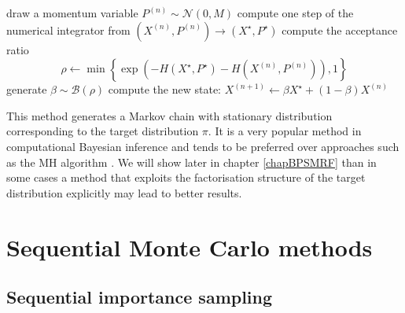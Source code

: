 \begin{algorithm}[!h]\small
	\caption{\label{alg:hmc-alg}}
	\begin{algorithmic}[1]
		\State draw a momentum variable $P^{(n)}\sim\mathcal N(0, M) $
		\State compute one step of the numerical integrator from $(X^{(n)},P^{(n)})\rightarrow (X^{\star},P^{\star})$ 
		\State compute the acceptance ratio
			$$ \rho \leftarrow \min\left\{\exp\left(-H(X^{\star},P^{\star})-H(X^{(n)}, P^{(n)})\right),1\right\} $$
		\State generate $\beta \sim\mathcal B(\rho)$
		\State compute the new state: $X^{(n+1)} \leftarrow \beta X^{\star}+(1-\beta)X^{(n)}$
	\end{algorithmic}
\end{algorithm}

This method generates a Markov chain with stationary distribution corresponding to the target distribution $\pi$. 
It is a very popular method in computational Bayesian inference and tends to be preferred over approaches such as the MH algorithm \citep{green15}. We will show later in chapter \ref{chapBPSMRF} than in some cases a method that exploits the factorisation structure of the target distribution explicitly may lead to better results. 

\section{Sequential Monte Carlo methods}
\subsection{Sequential importance sampling}
